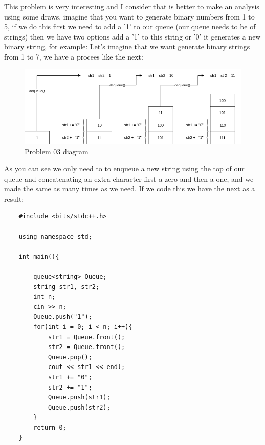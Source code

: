 This problem is very interesting and I consider that is better to make an analysis using some draws, imagine that you want to generate binary numbers from 1 to 5, if we do this first we need to add a '1' to our queue (our queue needs to be of strings) then we have two options add a '1' to this string or '0' it generates a new binary string, for example: Let's imagine that we want generate binary strings from 1 to 7, we have a procees like the next:

\begin{figure}[H]
    \centering
    \includegraphics[width=1.00\textwidth]{Images/DataStructures/Queue/queue_example.png}
    \caption{Problem 03 diagram}
    \label{fig:queue-problem-03}
\end{figure}

As you can see we only need to to enqueue a new string using the top of our queue and concatenating an extra character first a zero and then a one, and we made the same as many times as we need. If we code this we have the next as a result:

\begin{lstlisting}
    #include <bits/stdc++.h>

    using namespace std;

    int main(){
        
        queue<string> Queue;
        string str1, str2;
        int n;
        cin >> n;
        Queue.push("1");
        for(int i = 0; i < n; i++){
            str1 = Queue.front();
            str2 = Queue.front();
            Queue.pop();
            cout << str1 << endl;
            str1 += "0";
            str2 += "1";
            Queue.push(str1);
            Queue.push(str2);
        }
        return 0;
    }
\end{lstlisting}